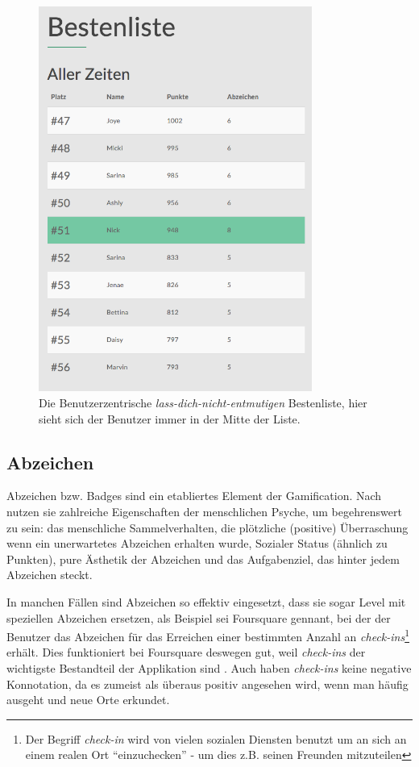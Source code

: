 \documentclass[12pt,twoside]{book}
\begin{document}
\begin{figure}[htbp]
    \centering
    \includegraphics[width=0.8\textwidth]{images/infoboard_leaderboard_user.png}
    \caption{Die Benutzerzentrische \textit{lass-dich-nicht-entmutigen} Bestenliste, hier sieht sich der Benutzer immer in der Mitte der Liste.}
    \label{fig:leaderboarduser}
\end{figure}

\subsection{Abzeichen}
Abzeichen bzw. Badges sind ein etabliertes Element der Gamification. Nach \citep[pp. 55]{zichermann2011gamification} nutzen sie zahlreiche Eigenschaften der menschlichen Psyche, um begehrenswert zu sein: das menschliche Sammelverhalten, die plötzliche (positive) Überraschung wenn ein unerwartetes Abzeichen erhalten wurde, Sozialer Status (ähnlich zu Punkten), pure Ästhetik der Abzeichen und das Aufgabenziel, das hinter jedem Abzeichen steckt.

In manchen Fällen sind Abzeichen so effektiv eingesetzt, dass sie sogar Level mit speziellen Abzeichen ersetzen, als Beispiel sei Foursquare gennant, bei der der Benutzer das Abzeichen für das Erreichen einer bestimmten Anzahl an \textit{check-ins}\footnote{Der Begriff \textit{check-in} wird von vielen sozialen Diensten benutzt um an sich an einem realen Ort ``einzuchecken'' - um dies z.B. seinen Freunden mitzuteilen} erhält. Dies funktioniert bei Foursquare deswegen gut, weil \textit{check-ins} der wichtigste Bestandteil der Applikation sind \citep[pp. 57]{zichermann2011gamification}. Auch haben \textit{check-ins} keine negative Konnotation, da es zumeist als überaus positiv angesehen wird, wenn man häufig ausgeht und neue Orte erkundet.
\end{document}
